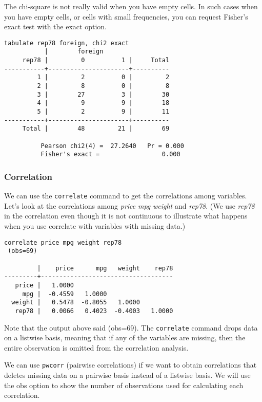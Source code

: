 The chi-square is not really valid when you have empty cells. In such cases when you have empty cells, or cells with small frequencies, you can request Fisher's exact test with the exact option.

\begin{lstlisting}
tabulate rep78 foreign, chi2 exact
           |        foreign
     rep78 |         0          1 |     Total
-----------+----------------------+----------
         1 |         2          0 |         2
         2 |         8          0 |         8
         3 |        27          3 |        30
         4 |         9          9 |        18
         5 |         2          9 |        11
-----------+----------------------+----------
     Total |        48         21 |        69

          Pearson chi2(4) =  27.2640   Pr = 0.000
          Fisher's exact =                 0.000
\end{lstlisting}

\subsubsection{Correlation}

We can use the \lstinline{correlate} command to get the correlations among variables. Let's look at the correlations among \textit{price} \textit{mpg} \textit{weight} and \textit{rep78}. (We use \textit{rep78} in the correlation even though it is not continuous to illustrate what happens when you use correlate with variables with missing data.)

\begin{lstlisting}
correlate price mpg weight rep78
 (obs=69)

         |    price      mpg   weight    rep78
---------+------------------------------------
   price |   1.0000
     mpg |  -0.4559   1.0000
  weight |   0.5478  -0.8055   1.0000
   rep78 |   0.0066   0.4023  -0.4003   1.0000
\end{lstlisting}

Note that the output above said (obs=69). The \lstinline{correlate} command drops data on a listwise basis, meaning that if any of the variables are missing, then the entire observation is omitted from the correlation analysis.

We can use \lstinline{pwcorr} (pairwise correlations) if we want to obtain correlations that deletes missing data on a pairwise basis instead of a listwise basis. We will use the obs option to show the number of observations used for calculating each correlation.

